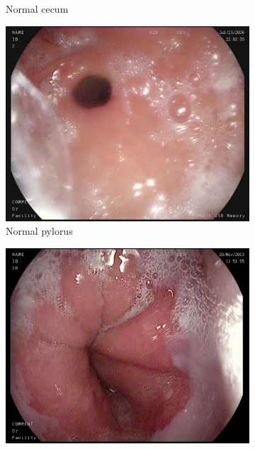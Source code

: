 \begin{figure}
\begin{subfigure}[b]{0.4\textwidth}
            \caption{{\small Normal cecum}}    
            \label{fig:kvasir-normal-cecum}
        \end{subfigure}
        \qquad
        \begin{subfigure}[b]{0.4\textwidth}
            \centering
            \includegraphics[width=\textwidth]{experiments/images/normal-pylorus.jpg}
            \caption{{\small Normal pylorus }}    
            \label{fig:kvasir-normal-pylorus}
        \end{subfigure}
        \qquad
        \begin{subfigure}[b]{0.4\textwidth}  
            \centering 
            \includegraphics[width=\textwidth]{experiments/images/normal-z-line.jpg}

\end{subfigure}
\end{figure}
